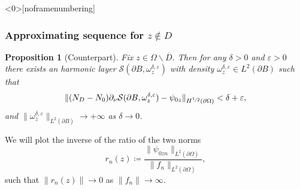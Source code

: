 \documentclass[10pt,xcolor={dvipsnames}]{beamer}
\newtheorem{proposition}[subsection]{Proposition}
\theoremstyle{plain}
\newtheorem{remark}[subsection]{Remark}
\theoremstyle{plain}
\let\epsilon\varepsilon
\begin{document}
\begin{frame}

\end{frame}
\begin{frame}<0>[noframenumbering]
 \frametitle{Approximating sequence for $z\notin D$}
 \begin{proposition}[Counterpart]
\label{prop:lsm-counterpart}
Fix $z \in \Omega\backslash\overline{D}$. Then for any $\delta>0$ and $\epsilon > 0$ there exists an harmonic layer $\mathcal{S}(\partial B, \omega^{\delta, \epsilon}_z)$ with density $\omega^{\delta, \epsilon}_z\in L^2(\partial B)$ such that
\begin{equation}
 \|({N_D} - {N_0})\partial_\nu\mathcal{S}(\partial B, \omega^{\delta,\epsilon}_z) - \psi_{0z}\|_{H^{\nicefrac{1}{2}}(\partial\Omega)} < \delta + \epsilon,
\end{equation}
and $\|\omega^{\delta, \epsilon}_z\|_{L^2(\partial B)}\to + \infty$ as $\delta\to 0$.
\end{proposition}
We will plot the inverse of the ratio of the two norms
\begin{equation}
 r_n(z)\coloneqq\frac{\|\psi_{0zn}\|_{L^2(\partial \Omega)}}{\|f_n\|_{L^2(\partial \Omega)}},
\end{equation}
such that $\|r_n(z)\|\to 0$ as $\|f_n\|\to \infty$.

\end{frame}
\end{document}
